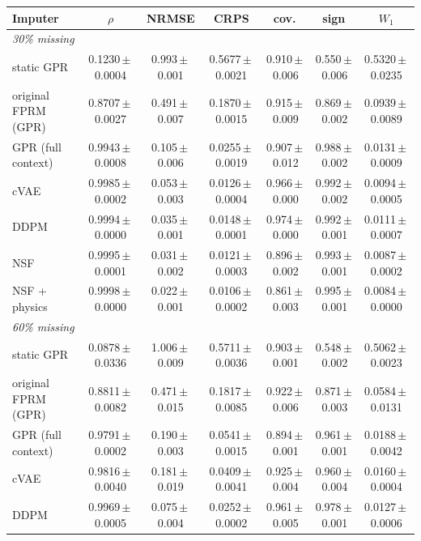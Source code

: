 \begin{tabular}{lcccccc}
\toprule
Imputer & $\rho$ & NRMSE & CRPS & cov. & sign & $W_1$\\
\midrule
\multicolumn{7}{l}{\textit{30\% missing}}\\
static GPR & 0.1230\,$\pm$\,0.0004 & 0.993\,$\pm$\,0.001 & 0.5677\,$\pm$\,0.0021 & 0.910\,$\pm$\,0.006 & 0.550\,$\pm$\,0.006 & 0.5320\,$\pm$\,0.0235\\
original FPRM (GPR) & 0.8707\,$\pm$\,0.0027 & 0.491\,$\pm$\,0.007 & 0.1870\,$\pm$\,0.0015 & 0.915\,$\pm$\,0.009 & 0.869\,$\pm$\,0.002 & 0.0939\,$\pm$\,0.0089\\
GPR (full context) & 0.9943\,$\pm$\,0.0008 & 0.105\,$\pm$\,0.006 & 0.0255\,$\pm$\,0.0019 & 0.907\,$\pm$\,0.012 & 0.988\,$\pm$\,0.002 & 0.0131\,$\pm$\,0.0009\\
cVAE & 0.9985\,$\pm$\,0.0002 & 0.053\,$\pm$\,0.003 & 0.0126\,$\pm$\,0.0004 & 0.966\,$\pm$\,0.000 & 0.992\,$\pm$\,0.002 & 0.0094\,$\pm$\,0.0005\\
DDPM & 0.9994\,$\pm$\,0.0000 & 0.035\,$\pm$\,0.001 & 0.0148\,$\pm$\,0.0001 & 0.974\,$\pm$\,0.000 & 0.992\,$\pm$\,0.001 & 0.0111\,$\pm$\,0.0007\\
NSF & 0.9995\,$\pm$\,0.0001 & 0.031\,$\pm$\,0.002 & 0.0121\,$\pm$\,0.0003 & 0.896\,$\pm$\,0.002 & 0.993\,$\pm$\,0.001 & 0.0087\,$\pm$\,0.0002\\
NSF + physics & 0.9998\,$\pm$\,0.0000 & 0.022\,$\pm$\,0.001 & 0.0106\,$\pm$\,0.0002 & 0.861\,$\pm$\,0.003 & 0.995\,$\pm$\,0.001 & 0.0084\,$\pm$\,0.0000\\
\midrule
\multicolumn{7}{l}{\textit{60\% missing}}\\
static GPR & 0.0878\,$\pm$\,0.0336 & 1.006\,$\pm$\,0.009 & 0.5711\,$\pm$\,0.0036 & 0.903\,$\pm$\,0.001 & 0.548\,$\pm$\,0.002 & 0.5062\,$\pm$\,0.0023\\
original FPRM (GPR) & 0.8811\,$\pm$\,0.0082 & 0.471\,$\pm$\,0.015 & 0.1817\,$\pm$\,0.0085 & 0.922\,$\pm$\,0.006 & 0.871\,$\pm$\,0.003 & 0.0584\,$\pm$\,0.0131\\
GPR (full context) & 0.9791\,$\pm$\,0.0002 & 0.190\,$\pm$\,0.003 & 0.0541\,$\pm$\,0.0015 & 0.894\,$\pm$\,0.001 & 0.961\,$\pm$\,0.001 & 0.0188\,$\pm$\,0.0042\\
cVAE & 0.9816\,$\pm$\,0.0040 & 0.181\,$\pm$\,0.019 & 0.0409\,$\pm$\,0.0041 & 0.925\,$\pm$\,0.004 & 0.960\,$\pm$\,0.004 & 0.0160\,$\pm$\,0.0004\\
DDPM & 0.9969\,$\pm$\,0.0005 & 0.075\,$\pm$\,0.004 & 0.0252\,$\pm$\,0.0002 & 0.961\,$\pm$\,0.005 & 0.978\,$\pm$\,0.001 & 0.0127\,$\pm$\,0.0006\\

\end{tabular}

